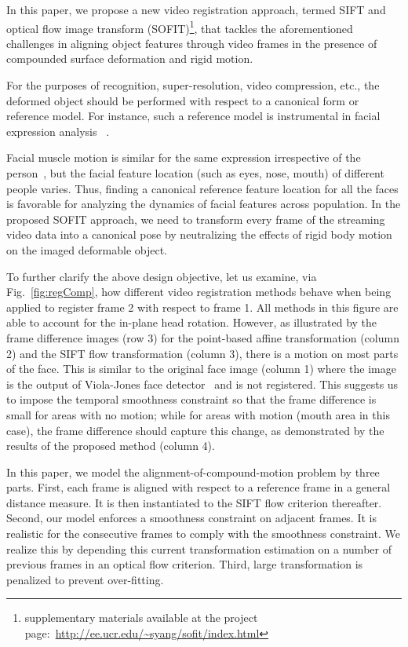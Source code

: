 \documentclass[10pt,journal]{IEEEtran}
\begin{document}
In this paper, we propose a new video registration approach, termed SIFT and optical flow image transform (SOFIT)\footnote{supplementary materials available at the project page:~\url{http://ee.ucr.edu/~syang/sofit/index.html}}, that tackles the aforementioned challenges in aligning object features through video frames in the presence of compounded surface deformation and rigid motion.

For the purposes of recognition, super-resolution, video compression, etc., the deformed object should be performed with respect to a canonical form or reference model.
For instance, such a reference model is instrumental in facial expression analysis ~\cite{Yang_SMCB12}.

Facial muscle motion is similar for the same expression irrespective of the person~\cite{Ekman78}, but the facial feature location (such as eyes, nose, mouth) of different people varies. Thus, finding a canonical reference feature location for all the faces is favorable for analyzing the dynamics of facial features across population. In the proposed SOFIT approach, we need to transform every frame of the streaming video data into a canonical pose by neutralizing the effects of rigid body motion on the imaged deformable object.

To further clarify the above design objective, let us examine, via Fig.~\ref{fig:regComp}, how different video registration methods behave when being applied to register frame 2 with respect to frame 1.  All methods in this figure are able to account for the in-plane head rotation. However, as illustrated by the frame difference images (row 3) for the point-based affine transformation (column 2) and the SIFT flow transformation (column 3), there is a motion on most parts of the face. This is similar to the original face image (column 1) where the image is the output of Viola-Jones face detector~\cite{Viola_IJCV04} and is not registered. This suggests us to impose the temporal smoothness constraint so that the frame difference is small for areas with no motion; while for areas with motion (mouth area in this case), the frame difference should capture this change, as demonstrated by the results of the proposed method (column 4).

In this paper, we model the alignment-of-compound-motion problem by three parts. First, each frame is aligned with respect to a reference frame in a general distance measure. It is then instantiated to the SIFT flow criterion thereafter. Second, our model enforces a smoothness constraint on adjacent frames. It is realistic for the consecutive frames to comply with the smoothness constraint. We realize this by depending this current transformation estimation on a number of previous frames in an optical flow criterion. Third, large transformation is penalized to prevent over-fitting. 
\end{document}
